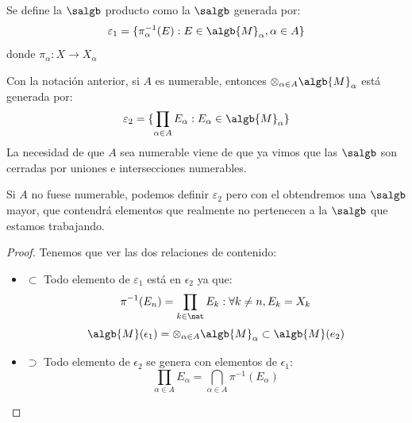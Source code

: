 \documentclass{apuntes}
\begin{document}
\begin{defn}
Se define la $\salgb$ producto como la $\salgb$ generada por:
\[\varepsilon_1 = \{\pi_\alpha^{-1}(E):E \in \algb{M}_\alpha, \alpha\in A\}\]
donde $\pi_\alpha: X \rightarrow X_\alpha$
\end{defn}

\begin{prop}
Con la notación anterior, si $A$ es numerable, entonces $\otimes_{\alpha\in A}\algb{M}_\alpha$ está generada por:
\[\varepsilon_2 = \{\prod_{\alpha\in A}E_\alpha:E_\alpha \in \algb{M}_\alpha\}\]
La necesidad de que $A$ sea numerable viene de que ya vimos que las $\salgb$ son cerradas por uniones e intersecciones numerables.

Si $A$ no fuese numerable, podemos definir $\varepsilon_2$ pero con el obtendremos una $\salgb$ mayor, que contendrá elementos que realmente no pertenecen a la $\salgb$ que estamos trabajando.
\end{prop}
\begin{proof}
Tenemos que ver las dos relaciones de contenido:
\begin{itemize}
\item $\subset$
Todo elemento de $\varepsilon_1$ está en $\epsilon_2$ ya que:
\[\pi^{-1}(E_n)=\prod_{k \in \nat}E_k : \forall k\neq n, E_k=X_k\]
\[\algb{M}(\epsilon_1)=\otimes_{\alpha \in A}\algb{M}_\alpha \subset \algb{M}(e_2)\]
\item $\supset$
Todo elemento de $\epsilon_2$ se genera con elementos de $\epsilon_1$:
\[\prod_{\alpha\in A}E_\alpha = \bigcap_{\alpha\in A} \pi^{-1}(E_\alpha)\]
\end{itemize}
\end{proof}
\end{document}
